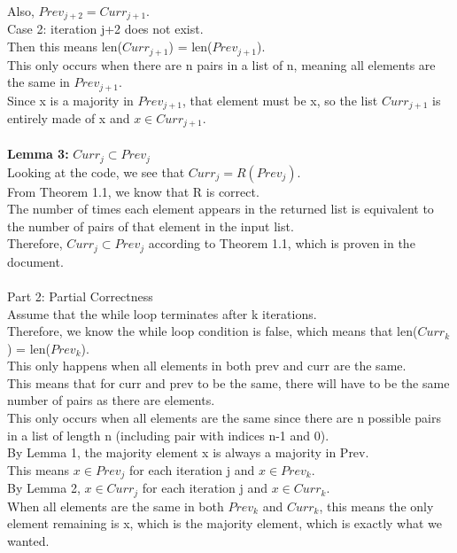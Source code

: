 \documentclass[12pt]{article}
\begin{document}
Also, $Prev_{j+2} = Curr_{j+1}$.\\
Case 2: iteration j+2 does not exist.\\
Then this means len($Curr_{j+1}$) = len($Prev_{j+1}$).\\
This only occurs when there are n pairs in a list of n, meaning all elements are the same in $Prev_{j+1}$.\\
Since x is a majority in $Prev_{j+1}$, that element must be x, so the list $Curr_{j+1}$ is entirely made of x and $x \in Curr_{j+1}$.\\
\\
\textbf{Lemma 3:} $Curr_j \subset Prev_j$\\
Looking at the code, we see that $Curr_j = R(Prev_j)$.\\
From Theorem 1.1, we know that R is correct.\\
The number of times each element appears in the returned list is equivalent to the number of pairs of that element in the input list.\\
Therefore, $Curr_j \subset Prev_j$ according to Theorem 1.1, which is proven in the document.\\
\\
Part 2: Partial Correctness\\
Assume that the while loop terminates after k iterations.\\
Therefore, we know the while loop condition is false, which means that len($Curr_k$) = len($Prev_k$).\\
This only happens when all elements in both prev and curr are the same.\\
This means that for curr and prev to be the same, there will have to be the same number of pairs as there are elements.\\
This only occurs when all elements are the same since there are n possible pairs in a list of length n (including pair with indices n-1 and 0).\\
By Lemma 1, the majority element x is always a majority in Prev.\\
This means $x \in Prev_j$ for each iteration j and $x \in Prev_k$.\\
By Lemma 2, $x \in Curr_j$ for each iteration j and $x \in Curr_k$.\\
When all elements are the same in both $Prev_k$ and $Curr_k$, this means the only element remaining is x, which is the majority element, which is exactly what we wanted.\\
\\
\end{document}
